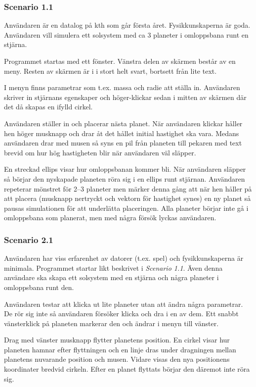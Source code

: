 \subsubsection{Scenario 1.1}

Användaren är en datalog på kth som går första året.
Fysikkunskaperna är goda.
Användaren vill simulera ett solsystem med ca 3 planeter
i omloppsbana runt en stjärna.

Programmet startas med ett fönster.
Vänstra delen av skärmen består av en meny.
Resten av skärmen är i i stort helt svart, bortsett
från lite text.

I menyn finns parametrar som t.ex. massa och radie att ställa in.
Användaren skriver in stjärnans egenskaper och höger-klickar
sedan i mitten av skärmen där det då skapas en ifylld cirkel.

Användaren ställer in och placerar nästa planet.
När användaren klickar håller hen höger musknapp
och drar åt det hållet initial hastighet ska vara.
Medans användaren drar med musen så syns en pil från planeten till
pekaren med text brevid om hur hög hastigheten blir när användaren väl släpper.

En streckad ellips visar hur omloppsbanan kommer bli.
När användaren släpper så börjar den nyskapade planeten röra sig
i en ellips runt stjärnan.
Användaren repeterar mönstret för 2--3 planeter men märker denna gång
att när hen håller på att placera (musknapp nertryckt och vektorn
för hastighet synes) en ny planet så pausas simulationen för att
underlätta placeringen.
Alla planeter börjar inte gå i omloppsbana som planerat,
men med några försök lyckas användaren.

\subsubsection{Scenario 2.1}

Användaren har viss erfarenhet av datorer (t.ex. spel) och
fysikkunskaperna är minimala.
Programmet startar likt beskrivet i \textit{Scenario 1.1}.
Även denna användare ska skapa ett solsystem med en stjärna
och några planeter i omloppsbana runt den.

Användaren testar att klicka ut lite planeter utan att ändra några parametrar.
De rör sig inte så användaren försöker klicka och dra i en av dem.
Ett snabbt vänsterklick på planeten markerar den och ändrar i menyn
till vänster.

Drag med vänster musknapp flytter planetens position.
En cirkel visar hur planeten hamnar efter flyttningen och en linje dras
under dragningen mellan planetens nuvarande position och musen.
Vidare visas den nya positionens koordinater bredvid cirkeln.
Efter en planet flyttats börjar den däremot inte röra sig.


